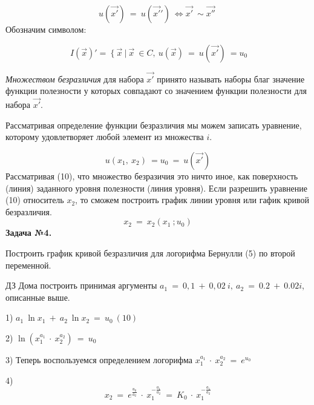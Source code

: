 \documentclass[12pt,a4paper]{article}
\begin{document}
\begin{equation}
u\left(\overrightarrow{x'}\right) \ =\ u\left(\overrightarrow{x'} '\right) \ \Leftrightarrow \overrightarrow{x'} \ \sim \overrightarrow{x''} \ 
\end{equation}
Обозначим символом: 


\begin{equation}
\ I\left(\vec{x}\right) '=\ \{\ \vec{x} \ |\ \vec{x} \ \in C,\ u\left(\vec{x}\right) \ =\ u\left(\overrightarrow{x'}\right) \ =u_{0}
\end{equation}


	\textit{Множеством безразличия} для набора $\displaystyle \overrightarrow{x'}$ принято называть наборы благ значение функции полезности у которых совпадают со значением функции полезности для набора $\displaystyle \overrightarrow{x'}$.

Рассматривая определение функции безразличия мы можем записать уравнение, которому удовлетворяет любой элемент из множества $\displaystyle i$.


\begin{equation}
u( x_{1} ,\ x_{2}) \ =u_{0} \ =\ u\left(\overrightarrow{x'}\right)
\end{equation}
Рассматривая (10), что множество безразичия это ничто иное, как поверхность (линия) заданного уровня полезности (линия уровня). Если разрешить уравнение (10) относитель $\displaystyle x_{2}$, то сможем построить график линии уровня или гафик кривой безразличия. 
\begin{equation}
x_{2} \ =\ x_{2}( x_{1} \ ;u_{0})
\end{equation}
\textbf{Задача №4.} 

Построить график кривой безразличия для логорифма Бернулли (5) по второй переменной.

$\displaystyle \boxed{\text{ДЗ}}$ Дома построить принимая аргументы $\displaystyle a_{1} \ =\ 0,1\ +\ 0,02\ i,\ a_{2} \ =\ 0.2\ +\ 0.02i$, описанные выше.

1) $\displaystyle a_{1} \ \ln x_{1} \ +\ a_{2} \ \ln x_{2} \ =\ u_{0} \ ( 10)$

2) $\displaystyle \ln\left( x^{a_{1}}_{1} \ \cdot \ x^{a_{2}}_{2}\right) \ =\ u_{0}$

3) Теперь воспользуемся определением логорифма $\displaystyle x^{a_{1}}_{1} \ \cdot \ x^{a_{2}}_{2} \ =\ e^{u_{0}}$

4) 
\begin{equation}
x_{2} \ =\ e^{\frac{u_{0}}{a_{2}}} \ \cdot \ x^{-\frac{a_{1}}{a_{2}}}_{1} \ =\ K_{0} \ \cdot \ x^{-\frac{a_{1}}{a_{2}}}_{1}
\end{equation}
\end{document}
